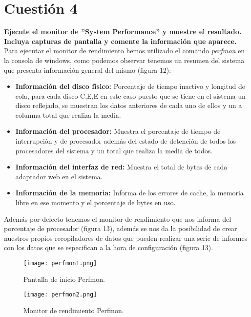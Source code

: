 \documentclass[a4paper, 11pt]{article} %
\begin{document}
\pagebreak

\section{Cuestión 4}
\textbf{Ejecute el monitor de ''System Performance'' y muestre el resultado. Incluya capturas de pantalla y comente la información que aparece.}\\

\cite{10}Para ejecutar el monitor de rendimiento hemos utilizado el comando \textit{perfmon} en la consola de windows, como podemos observar tenemos un resumen del sistema que presenta información general del mismo (figura 12):

\begin{itemize}
\item \textbf{Información del disco físico:} Porcentaje de tiempo inactivo y longitud de cola, para cada disco C,E,E en este caso puesto que se tiene en el sistema un disco reflejado, se muestran los datos anteriores de cada uno de ellos y un a columna total que realiza la media.
\item \textbf{Información del procesador:} Muestra el porcentaje de tiempo de interrupción y de procesador además del estado de detención de todos los procesadores del sistema y un total que realiza la media de todos.
\item \textbf{Información del interfaz de red:} Muestra el total de bytes de cada adaptador web en el sistema.
\item \textbf{Información de la memoria:} Informa de los errores de cache, la memoria libre en ese momento y el porcentaje de bytes en uso.
\end{itemize}

Además por defecto tenemos el monitor de rendimiento que nos informa del porcentaje de procesador (figura 13), además se nos da la posibilidad de crear nuestros propios recopiladores de datos que pueden realizar una serie de informes con los datos que se especifican a la hora de configuración (figura 13).
\begin{figure}[H]
\centering 
\texttt{[image: perfmon1.png]} 
\caption{Pantalla de inicio Perfmon.} 
\label{contexto:figura} 
\end{figure}
\begin{figure}[H]
\centering 
\texttt{[image: perfmon2.png]} 
\caption{Monitor de rendimiento Perfmon.} 
\label{contexto:figura} 
\end{figure}
\end{document}
